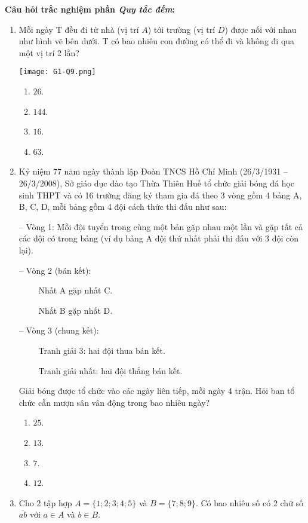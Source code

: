 \noindent\textbf{Câu hỏi trắc nghiệm phần \textit{Quy tắc đếm}:}
\begin{enumerate}[label=\textbf{Câu \arabic*.},align=left,left=0cm..0cm,itemindent=*]
	\item Mỗi ngày T đều đi từ nhà (vị trí $A$) tới trường (vị trí $D$) được nối với nhau như hình vẽ bên dưới. T có bao nhiêu con đường có thể đi và không đi qua một vị trí 2 lần?\par {\centering\texttt{[image: G1-Q9.png]}\par}
	\begin{enumerate}[label=\textbf{\Alph*.},align=left,left=1cm..0cm,itemindent=*]
		\item $26$. \item $144$. \item $16$. \item $63$.
	\end{enumerate}
	\item Kỷ niệm 77 năm ngày thành lập Đoàn TNCS Hồ Chí Minh (26/3/1931 – 26/3/2008), Sở giáo dục đào tạo Thừa Thiên Huế tổ chức giải bóng đá học sinh THPT và có 16 trường đăng ký tham gia đá theo 3 vòng gồm 4 bảng A, B, C, D, mỗi bảng gồm 4 đội cách thức thi đấu như sau:\par
	– Vòng 1: Mỗi đội tuyển trong cùng một bản gặp nhau một lần và gặp tất cả các đội có trong bảng (ví dụ bảng A đội thứ nhất phải thi đấu với 3 đội còn lại).\par
	– Vòng 2 (bán kết):\par
	~~~~ Nhất A gặp nhất C.\par
	~~~~ Nhất B gặp nhất D.\par
	– Vòng 3 (chung kết):\par
	~~~~ Tranh giải 3: hai đội thua bán kết.\par
	~~~~ Tranh giải nhất: hai đội thắng bán kết.\par
	Giải bóng được tổ chức vào các ngày liên tiếp, mỗi ngày 4 trận. Hỏi ban tổ chức cần mượn sân vân động trong bao nhiêu ngày?
	\begin{enumerate}[label=\textbf{\Alph*.},align=left,left=1cm..0cm,itemindent=*]
		\item $25$. \item $13$. \item $7$. \item $12$.
	\end{enumerate}
	\item Cho 2 tập hợp $A=\{1;2;3;4;5\}$ và $B=\{7;8;9\}$. Có bao nhiêu số có 2 chữ số $\overline{ab}$ với $a\in A$ và $b\in B$.

\end{enumerate}
